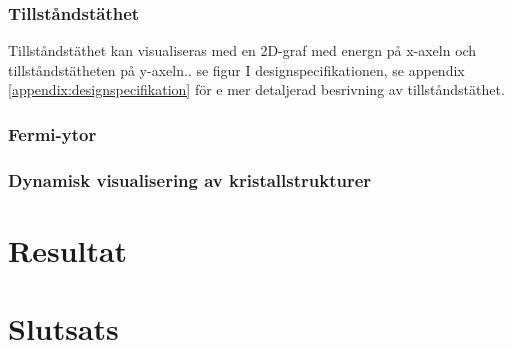 \documentclass[a4paper,12pt]{article}
\begin{document}
\subsubsection{Tillståndstäthet}
Tillståndstäthet kan visualiseras med en 2D-graf med energn på x-axeln och tillståndstätheten på y-axeln.. se figur %
I designspecifikationen, se appendix \ref{appendix:designspecifikation} för e mer detaljerad besrivning av tillståndstäthet.

\subsubsection{Fermi-ytor}

\subsubsection{Dynamisk visualisering av kristallstrukturer}



\section{Resultat}
\label{ch:resultat}

\section{Slutsats}
\label{ch:slutsats}


\newpage
{}
\printbibliography{}
\end{document}
